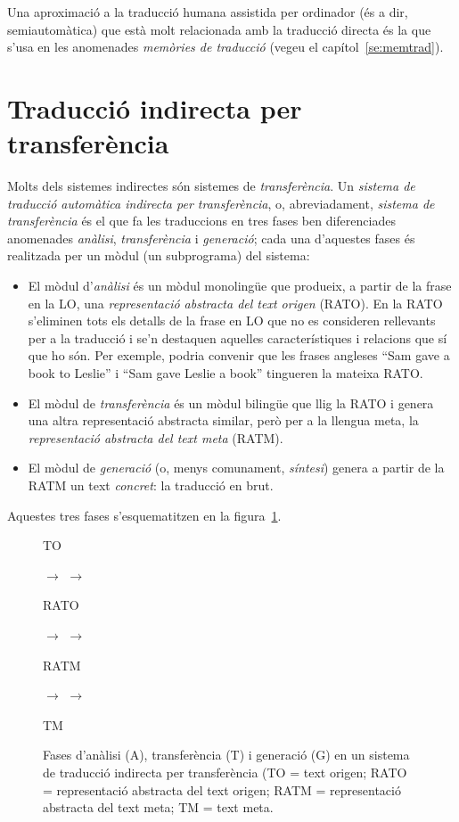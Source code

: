 Una aproximació a la traducció humana assistida per ordinador (és a
dir, semiautomàtica) que està molt relacionada amb la traducció
directa és la que s'usa en les anomenades \emph{memòries de traducció}
(vegeu el capítol~\ref{se:memtrad}). 
  

\section{Traducció  indirecta per transferència}

\label{ss:classtrans}
Molts dels sistemes indirectes són sistemes de
\emph{transferència}. Un \emph{sistema de traducció automàtica
  indirecta per transferència}, o, abreviadament, \emph{sistema de
  transferència} és el que fa les traduccions en tres fases ben
diferenciades anomenades \emph{anàlisi}, \emph{transferència} i
\emph{generació}; cada una d'aquestes fases és realitzada per un mòdul
(un subprograma) del sistema:
\begin{itemize}
\item El mòdul d'\emph{anàlisi} és un mòdul monolingüe que produeix, a
  partir de la frase en la LO, una \emph{representació abstracta del text
  origen} (RATO). En la RATO s'eliminen tots els detalls de la frase
  en LO que no es consideren rellevants per a la traducció i se'n destaquen
  aquelles característiques i relacions que sí que ho són.  Per
  exemple, podria convenir que les frases angleses ``Sam gave a book
  to Leslie'' i ``Sam gave Leslie a book'' \citep{arnold93j} tingueren
  la mateixa RATO.
\item El mòdul de \emph{transferència} és un mòdul bilingüe que llig
  la RATO i genera una altra representació abstracta similar, però per
  a la llengua meta, la \emph{representació abstracta del text meta}
  (RATM).
\item El mòdul de \emph{generació} (o, menys comunament,
  \emph{síntesi}) genera a partir de la RATM un text \emph{concret}: la
  traducció en brut.
\end{itemize}
Aquestes tres fases s'esquematitzen en la
figura~\ref{fg:transfer}. 


\begin{figure}
\begin{center}
\parbox{0.5cm}{TO} $\to$
 $\to$ 
\parbox{1.0cm}{RATO} $\to$
 $\to$
\parbox{1.25cm}{RATM} $\to$
 $\to$
\parbox{0.5cm}{TM} 
\end{center}
\caption{Fases d'anàlisi (A), transferència (T) i generació (G) en un
sistema de traducció indirecta per transferència (TO = text origen; RATO = representació abstracta del text origen; RATM = representació abstracta del text meta; TM = text meta.}
\label{fg:transfer} 
\end{figure}


